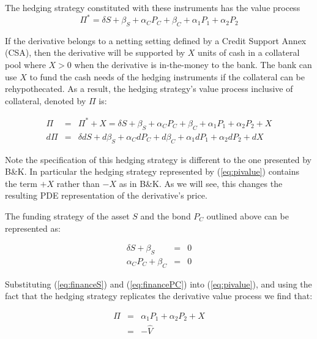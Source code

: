 \documentclass{tufte-handout}
\begin{document}
The hedging strategy constituted with these instruments has the value process
\begin{equation}
  \Pi^* = \delta S + \beta_S + \alpha_C P_C + \beta_C + \alpha_1 P_1 + \alpha_2 P_2
\end{equation}

If the derivative belongs to a netting setting defined by a Credit Support
Annex (CSA), then the derivative will be supported by $X$ units of cash in
a collateral pool where $X>0$ when the derivative is in-the-money to the bank.
The bank can use $X$ to fund the cash needs of the hedging instruments if
the collateral can be rehypothecated. As a result, the hedging strategy's value
process inclusive of collateral, denoted by $\Pi$ is:

\begin{eqnarray}
  \Pi & = & \Pi^* + X = \delta S + \beta_S + \alpha_C P_C + \beta_C +
          \alpha_1 P_1 + \alpha_2 P_2 + X \label{eq:pivalue} \\
  d\Pi & = & \delta dS + d\beta_S + \alpha_C dP_C + d\beta_C +
          \alpha_1 dP_1 + \alpha_2 dP_2 + dX \label{eq:pidelta}
\end{eqnarray}

Note the specification of this hedging strategy is different to the one
presented by B\&K. In particular the hedging strategy represented by
(\ref{eq:pivalue}) contains the term $+X$ rather than $-X$ as in B\&K. As we will
see, this changes the resulting PDE representation of the derivative's price.

The funding strategy of the asset $S$ and the bond $P_C$ outlined above can be
represented as:

\begin{eqnarray}
  \delta S + \beta_S & = & 0 \label{eq:financeS} \\
  \alpha_C P_C + \beta_C & = & 0 \label{eq:financePC}
\end{eqnarray}

Substituting (\ref{eq:financeS}) and (\ref{eq:financePC}) into (\ref{eq:pivalue}),
and using the fact that the hedging strategy replicates the derivative value
process we find that:

\begin{eqnarray*}
  \Pi & = & \alpha_1 P_1 + \alpha_2 P_2 + X \\
      & = & -\hat{V}
\end{eqnarray*}
\end{document}
